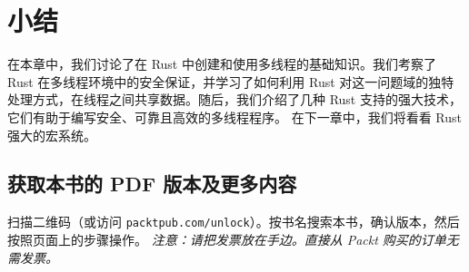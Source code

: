 \section{小结}
在本章中，我们讨论了在 Rust 中创建和使用多线程的基础知识。我们考察了 Rust 在多线程环境中的安全保证，并学习了如何利用 Rust 对这一问题域的独特处理方式，在线程之间共享数据。随后，我们介绍了几种 Rust 支持的强大技术，它们有助于编写安全、可靠且高效的多线程程序。
在下一章中，我们将看看 Rust 强大的宏系统。
\begin{samepage}
\subsection{获取本书的 PDF 版本及更多内容}
扫描二维码（或访问 \texttt{packtpub.\allowbreak{}com/\allowbreak{}unlock}）。按书名搜索本书，确认版本，然后按照页面上的步骤操作。
\emph{注意：请把发票放在手边。直接从 Packt 购买的订单无需发票。}
\end{samepage}
